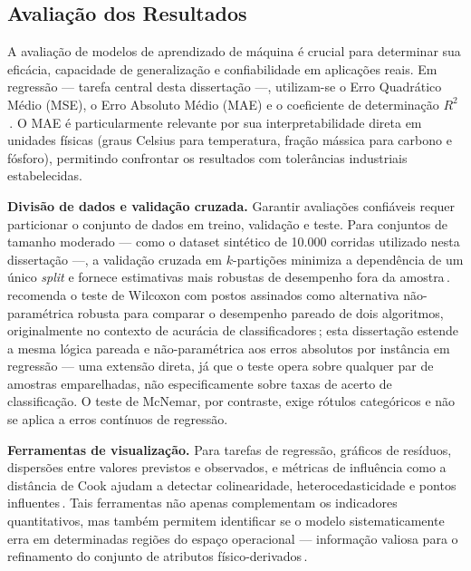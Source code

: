 \subsection{Avaliação dos Resultados}
\label{subsec:avaliacao}

A avaliação de modelos de aprendizado de máquina é crucial para determinar sua eficácia, capacidade de generalização e confiabilidade em aplicações reais. Em regressão — tarefa central desta dissertação —, utilizam-se o Erro Quadrático Médio (MSE), o Erro Absoluto Médio (MAE) e o coeficiente de determinação $R^{2}$\,\cite{bishop2006prml}. O MAE é particularmente relevante por sua interpretabilidade direta em unidades físicas (graus Celsius para temperatura, fração mássica para carbono e fósforo), permitindo confrontar os resultados com tolerâncias industriais estabelecidas.

\textbf{Divisão de dados e validação cruzada.}
Garantir avaliações confiáveis requer particionar o conjunto de dados em treino, validação e teste. Para conjuntos de tamanho moderado — como o dataset sintético de 10.000 corridas utilizado nesta dissertação —, a validação cruzada em $k$-partições minimiza a dependência de um único \textit{split} e fornece estimativas mais robustas de desempenho fora da amostra\,\cite{kohavi1995study}. \citeauthor{demsar2006statistical} recomenda o teste de Wilcoxon com postos assinados como alternativa não-paramétrica robusta para comparar o desempenho pareado de dois algoritmos, originalmente no contexto de acurácia de classificadores\,\cite{demsar2006statistical}; esta dissertação estende a mesma lógica pareada e não-paramétrica aos erros absolutos por instância em regressão --- uma extensão direta, já que o teste opera sobre qualquer par de amostras emparelhadas, não especificamente sobre taxas de acerto de classificação. O teste de McNemar, por contraste, exige rótulos categóricos e não se aplica a erros contínuos de regressão.

\textbf{Ferramentas de visualização.}
Para tarefas de regressão, gráficos de resíduos, dispersões entre valores previstos e observados, e métricas de influência como a distância de Cook ajudam a detectar colinearidade, heterocedasticidade e pontos influentes\,\cite{cook1977detection,belsley1980regression,anscombe1973graphs}. Tais ferramentas não apenas complementam os indicadores quantitativos, mas também permitem identificar se o modelo sistematicamente erra em determinadas regiões do espaço operacional — informação valiosa para o refinamento do conjunto de atributos físico-derivados\,\cite{inglis2022visualisation}.

